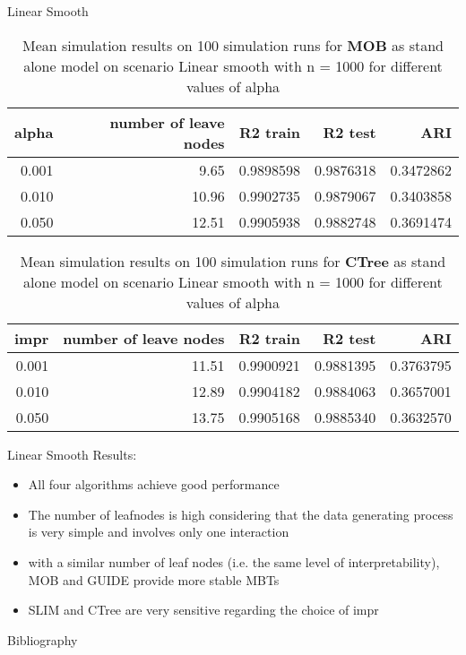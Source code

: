 \documentclass[9pt, xcolor=table]{beamer}
\begin{document}
\begin{frame}{Linear Smooth}
\begin{table}

\caption{Mean simulation results on 100 simulation runs for \textbf{MOB} as stand alone model on scenario Linear smooth with n = 1000 for different values of alpha}
\centering \small
\begin{tabular}[t]{r|r|r|r|r}
\hline
alpha & number of leave nodes & R2 train & R2 test & ARI\\
\hline
0.001 & 9.65 & 0.9898598 & 0.9876318 & 0.3472862\\
\hline
0.010 & 10.96 & 0.9902735 & 0.9879067 & 0.3403858\\
\hline
0.050 & 12.51 & 0.9905938 & 0.9882748 & 0.3691474\\
\hline
\end{tabular}
\end{table} 


\begin{table}

\caption{Mean simulation results on 100 simulation runs for \textbf{CTree} as stand alone model on scenario Linear smooth with n = 1000 for different values of alpha}
\centering \small
\begin{tabular}[t]{r|r|r|r|r}
\hline
impr & number of leave nodes & R2 train & R2 test & ARI\\
\hline
0.001 & 11.51 & 0.9900921 & 0.9881395 & 0.3763795\\
\hline
0.010 & 12.89 & 0.9904182 & 0.9884063 & 0.3657001\\
\hline
0.050 & 13.75 & 0.9905168 & 0.9885340 & 0.3632570\\
\hline
\end{tabular}
\end{table}
\end{frame}

\begin{frame}{Linear Smooth}
Results:
\begin{itemize}
    \item All four algorithms achieve good performance
    \item The number of leafnodes is high considering that the data generating process is very simple and involves only one interaction 
    \item with a similar number of leaf nodes (i.e. the same level of interpretability), MOB and GUIDE provide more stable MBTs
    \item SLIM and CTree are very sensitive regarding the choice of impr
\end{itemize}
    
\end{frame}


\begin{frame}{Bibliography}
    
    

\end{frame}
\end{document}
